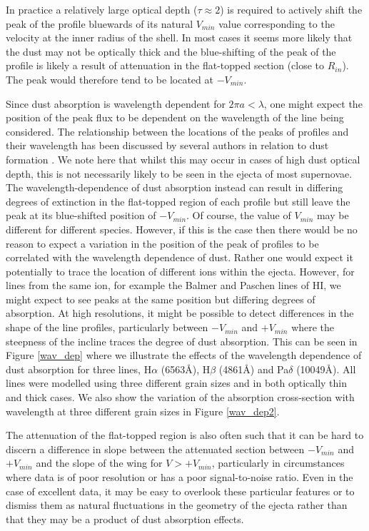 In practice a relatively large optical depth ($\tau \approx 2$) is 
required to actively shift the peak of the profile bluewards of its natural 
$V_{min}$ value corresponding to the velocity at the inner radius of the shell.  In most cases it seems more likely that the dust
may not be optically thick and the blue-shifting of the peak of the profile is 
likely a result of attenuation in the flat-topped section (close to 
$R_{in}$).  The peak would therefore tend to be located at $-V_{min}$.

Since dust absorption is wavelength dependent for $2\pi a < \lambda$, one might expect the 
position of the peak flux to be dependent on the wavelength of the line being 
considered.  The relationship between the locations of the peaks 
of profiles and their wavelength has been discussed by several authors in 
relation to dust formation \citep{Smith2012, Fransson2013, Gall2014}.  We 
note here that whilst this may occur in cases of high dust 
optical depth, this is not necessarily likely to be seen in the ejecta of 
most supernovae.  The wavelength-dependence of dust absorption instead 
can result in differing degrees of extinction in the flat-topped region of 
each profile but still leave the peak at its blue-shifted position of 
$-V_{min}$.  Of course, the value of $V_{min}$ may be different for 
different species.  However, if this is the case then there would be no 
reason to expect a variation in the position of the peak of profiles to be 
correlated with the wavelength dependence of dust.  Rather one would 
expect it potentially to trace the location of different ions within the ejecta. 
However, for lines from the same ion, for example the Balmer and Paschen lines of HI,
we might expect to see peaks at the same position but differing degrees of absorption.
At high resolutions, it might be possible to detect differences in the shape of the line 
profiles, particularly between $-V_{min}$ and $+V_{min}$ where the steepness of the 
incline traces the degree of dust absorption.  This can be seen in Figure \ref{wav_dep} 
where we illustrate the effects of the wavelength dependence of dust absorption for 
three lines, H$\alpha$ (6563\AA), H$\beta$ (4861\AA) and Pa$\delta$ (10049\AA).  
All lines were modelled using three different grain sizes and in both optically thin and 
thick cases.  We also show the variation of the absorption cross-section with 
wavelength at three different grain sizes in Figure \ref{wav_dep2}.

The attenuation of the flat-topped region is also often such that it can 
be hard to discern a difference in slope between the attenuated 
section between $-V_{min}$ and $+V_{min}$ and the slope of the wing for 
$V>+V_{min}$, particularly in circumstances where data is of poor 
resolution or has a poor signal-to-noise ratio.  Even in the case of 
excellent data, it may be easy to overlook these particular features or to 
dismiss them as natural fluctuations in the geometry of the ejecta rather than 
that they may be a product of dust absorption effects.

